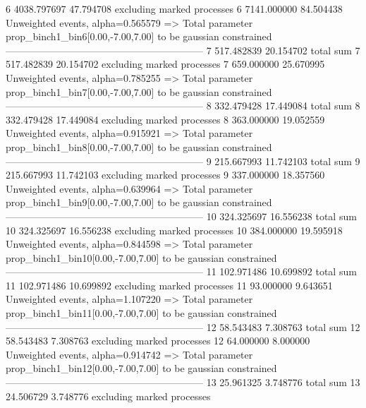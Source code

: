 6          4038.797697     47.794708       excluding marked processes    
6          7141.000000     84.504438       Unweighted events, alpha=0.565579
  => Total parameter prop_binch1_bin6[0.00,-7.00,7.00] to be gaussian constrained
------------------------------------------------------------
7          517.482839      20.154702       total sum                     
7          517.482839      20.154702       excluding marked processes    
7          659.000000      25.670995       Unweighted events, alpha=0.785255
  => Total parameter prop_binch1_bin7[0.00,-7.00,7.00] to be gaussian constrained
------------------------------------------------------------
8          332.479428      17.449084       total sum                     
8          332.479428      17.449084       excluding marked processes    
8          363.000000      19.052559       Unweighted events, alpha=0.915921
  => Total parameter prop_binch1_bin8[0.00,-7.00,7.00] to be gaussian constrained
------------------------------------------------------------
9          215.667993      11.742103       total sum                     
9          215.667993      11.742103       excluding marked processes    
9          337.000000      18.357560       Unweighted events, alpha=0.639964
  => Total parameter prop_binch1_bin9[0.00,-7.00,7.00] to be gaussian constrained
------------------------------------------------------------
10         324.325697      16.556238       total sum                     
10         324.325697      16.556238       excluding marked processes    
10         384.000000      19.595918       Unweighted events, alpha=0.844598
  => Total parameter prop_binch1_bin10[0.00,-7.00,7.00] to be gaussian constrained
------------------------------------------------------------
11         102.971486      10.699892       total sum                     
11         102.971486      10.699892       excluding marked processes    
11         93.000000       9.643651        Unweighted events, alpha=1.107220
  => Total parameter prop_binch1_bin11[0.00,-7.00,7.00] to be gaussian constrained
------------------------------------------------------------
12         58.543483       7.308763        total sum                     
12         58.543483       7.308763        excluding marked processes    
12         64.000000       8.000000        Unweighted events, alpha=0.914742
  => Total parameter prop_binch1_bin12[0.00,-7.00,7.00] to be gaussian constrained
------------------------------------------------------------
13         25.961325       3.748776        total sum                     
13         24.506729       3.748776        excluding marked processes    
